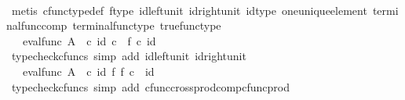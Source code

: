 \begin{isabellebody}
\ \ \ \ \ \ \ \ \ \isamarkupfalse%
\ {\isacharparenleft}{\kern0pt}metis\ cfunc{\isacharunderscore}{\kern0pt}type{\isacharunderscore}{\kern0pt}def\ f{\isacharunderscore}{\kern0pt}type\ id{\isacharunderscore}{\kern0pt}left{\isacharunderscore}{\kern0pt}unit\ id{\isacharunderscore}{\kern0pt}right{\isacharunderscore}{\kern0pt}unit\ id{\isacharunderscore}{\kern0pt}type\ one{\isacharunderscore}{\kern0pt}unique{\isacharunderscore}{\kern0pt}element\ terminal{\isacharunderscore}{\kern0pt}func{\isacharunderscore}{\kern0pt}comp\ terminal{\isacharunderscore}{\kern0pt}func{\isacharunderscore}{\kern0pt}type\ true{\isacharunderscore}{\kern0pt}func{\isacharunderscore}{\kern0pt}type{\isacharparenright}{\kern0pt}\isanewline
\ \ \ \ \ \ \ \isamarkupfalse%
\ \isamarkupfalse%
\ {\isachardoublequoteopen}{\isachardot}{\kern0pt}{\isachardot}{\kern0pt}{\isachardot}{\kern0pt}\ {\isacharequal}{\kern0pt}\ eval{\isacharunderscore}{\kern0pt}func\ A\ {\isasymOmega}\ {\isasymcirc}\isactrlsub c\ {\isasymlangle}id{\isacharparenleft}{\kern0pt}{\isasymOmega}{\isacharparenright}{\kern0pt}\ {\isasymcirc}\isactrlsub c\ {\isasymt}{\isacharcomma}{\kern0pt}\ f\ {\isasymcirc}\isactrlsub c\ id{\isacharparenleft}{\kern0pt}{\isasymone}{\isacharparenright}{\kern0pt}{\isasymrangle}{\isachardoublequoteclose}\isanewline
\ \ \ \ \ \ \ \ \ \isamarkupfalse%
\ {\isacharparenleft}{\kern0pt}typecheck{\isacharunderscore}{\kern0pt}cfuncs{\isacharcomma}{\kern0pt}\ simp\ add{\isacharcolon}{\kern0pt}\ id{\isacharunderscore}{\kern0pt}left{\isacharunderscore}{\kern0pt}unit{}\ id{\isacharunderscore}{\kern0pt}right{\isacharunderscore}{\kern0pt}unit{}{\isacharparenright}{\kern0pt}\isanewline
\ \ \ \ \ \ \ \isamarkupfalse%
\ \isamarkupfalse%
\ {\isachardoublequoteopen}{\isachardot}{\kern0pt}{\isachardot}{\kern0pt}{\isachardot}{\kern0pt}\ {\isacharequal}{\kern0pt}\ eval{\isacharunderscore}{\kern0pt}func\ A\ {\isasymOmega}\ {\isasymcirc}\isactrlsub c\ {\isacharparenleft}{\kern0pt}id{\isacharparenleft}{\kern0pt}{\isasymOmega}{\isacharparenright}{\kern0pt}\ {\isasymtimes}\isactrlsub f\ f{\isacharparenright}{\kern0pt}\ {\isasymcirc}\isactrlsub c\ {\isasymlangle}{\isasymt}{\isacharcomma}{\kern0pt}\ id{\isacharparenleft}{\kern0pt}{\isasymone}{\isacharparenright}{\kern0pt}{\isasymrangle}{\isachardoublequoteclose}\isanewline
\ \ \ \ \ \ \ \ \ \isamarkupfalse%
\ {\isacharparenleft}{\kern0pt}typecheck{\isacharunderscore}{\kern0pt}cfuncs{\isacharcomma}{\kern0pt}\ simp\ add{\isacharcolon}{\kern0pt}\ cfunc{\isacharunderscore}{\kern0pt}cross{\isacharunderscore}{\kern0pt}prod{\isacharunderscore}{\kern0pt}comp{\isacharunderscore}{\kern0pt}cfunc{\isacharunderscore}{\kern0pt}prod{\isacharparenright}{\kern0pt}\isanewline

\end{isabellebody}

